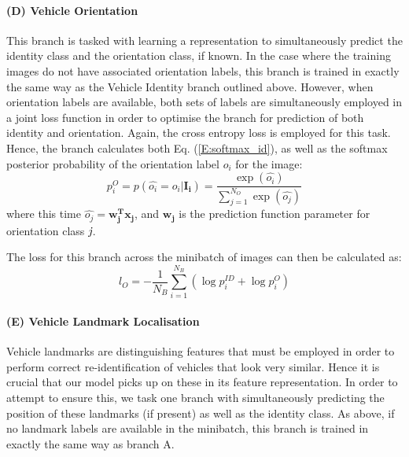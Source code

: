 \documentclass[10pt,twocolumn,letterpaper]{article}
\begin{document}
\paragraph{(D) Vehicle Orientation}

This branch is tasked with learning a representation to simultaneously predict the identity class and the orientation class, if known. In the case where the training images do not have associated orientation labels, this branch is trained in exactly the same way as the Vehicle Identity branch outlined above. However, when orientation labels are available, both sets of labels are simultaneously employed in a joint loss function in order to optimise the branch for prediction of both identity and orientation. Again, the cross entropy loss is employed for this task. Hence, the branch calculates both Eq. (\ref{E:softmax_id}), as well as the softmax posterior probability of the orientation label $o_i$ for the image:
\begin{equation}
  p_i^{O} = p(\hat{o_i} = o_i|\mathbf{I_i}) = \frac{\exp(\hat{o_i})}{\sum_{j=1}^{N_{O}}\exp(\hat{o_j})}
\end{equation}
where this time $\hat{o_j} = \mathbf{w_j^Tx_j}$, and $\mathbf{w_j}$ is the prediction function parameter for orientation class $\emph{j}$.

The loss for this branch across the minibatch of images can then be calculated as:
\begin{equation}
  l_{O} = -\frac{1}{N_B} \sum_{i=1}^{N_B}(\log{p_i^{ID}} + \log{p_i^{O}})
\end{equation}

\paragraph{(E) Vehicle Landmark Localisation}

Vehicle landmarks are distinguishing features that must be employed in order to perform correct  re-identification of vehicles that look very similar. Hence it is crucial that our model picks up on these in its feature representation. In order to attempt to ensure this, we task one branch with simultaneously predicting the position of these landmarks (if present) as well as the identity class. As above, if no landmark labels are available in the minibatch, this branch is trained in exactly the same way as branch A. 
\end{document}
